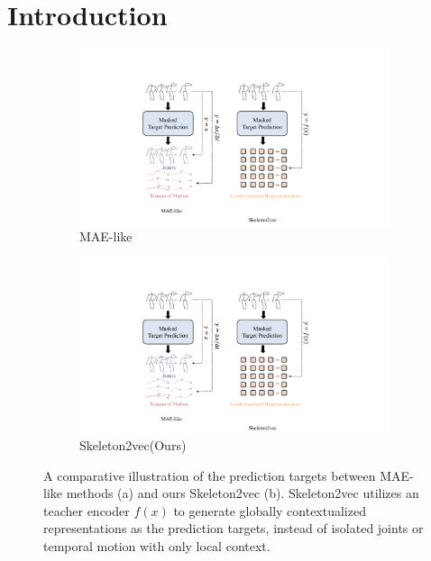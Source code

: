 \section{Introduction}
\label{sec:intro}

\begin{figure}[tb]
	\centering
	\begin{subfigure}{0.3\linewidth}
		\centering
		\includegraphics[width=1.0\linewidth]{figures/fig1_MAE.pdf}
		\caption{MAE-like}
		\label{fig1:MAE}
	\end{subfigure}
	\centering
	\begin{subfigure}{0.3\linewidth}
		\centering
		\includegraphics[width=1.0\linewidth]{figures/fig1_skeleton2vec.pdf}
		\caption{Skeleton2vec(Ours)}
		\label{fig1:skeleton2vec}
	\end{subfigure}
    \caption{
    A comparative illustration of the prediction targets between MAE-like methods (a) and
    ours Skeleton2vec (b). Skeleton2vec utilizes an teacher encoder $f(x)$ to generate
    globally contextualized representations as the prediction targets, instead of
    isolated joints or temporal motion with only local context.
    }
    \label{fig1}
\end{figure}

